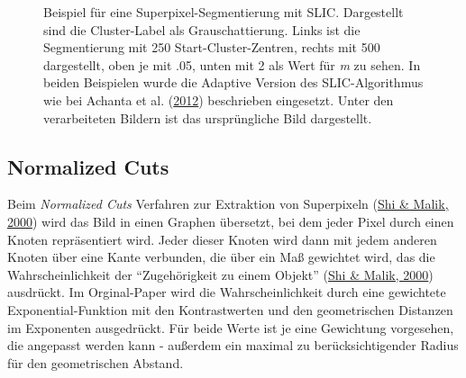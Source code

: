 \documentclass[
  12pt,
  openany]{book}
\begin{document}
\begin{figure}
{}

\caption[Beispiel für eine Superpixel-Segmentierung mit SLIC.]{Beispiel für eine Superpixel-Segmentierung mit SLIC. Dargestellt sind die Cluster-Label als Grauschattierung. Links ist die Segmentierung mit 250 Start-Cluster-Zentren, rechts mit 500 dargestellt, oben je mit .05, unten mit 2 als Wert für \emph{m} zu sehen. In beiden Beispielen wurde die Adaptive Version des SLIC-Algorithmus wie bei Achanta et al. (\protect\hyperlink{ref-achantaSLICSuperpixelsCompared2012}{2012}) beschrieben eingesetzt. Unter den verarbeiteten Bildern ist das ursprüngliche Bild dargestellt.}\label{fig:slicExample}
\end{figure}

\hypertarget{normalized-cuts}{%
\subsection{Normalized Cuts}\label{normalized-cuts}}

Beim \emph{Normalized Cuts} Verfahren zur Extraktion von Superpixeln (\protect\hyperlink{ref-shiNormalizedCutsImage2000}{Shi \& Malik, 2000}) wird das Bild in einen Graphen übersetzt, bei dem jeder Pixel durch einen Knoten repräsentiert wird. Jeder dieser Knoten wird dann mit jedem anderen Knoten über eine Kante verbunden, die über ein Maß gewichtet wird, das die Wahrscheinlichkeit der ``Zugehörigkeit zu einem Objekt'' (\protect\hyperlink{ref-shiNormalizedCutsImage2000}{Shi \& Malik, 2000}) ausdrückt.
Im Orginal-Paper wird die Wahrscheinlichkeit durch eine gewichtete Exponential-Funktion mit den Kontrastwerten und den geometrischen Distanzen im Exponenten ausgedrückt. Für beide Werte ist je eine Gewichtung vorgesehen, die angepasst werden kann - außerdem ein maximal zu berücksichtigender Radius für den geometrischen Abstand.
\end{document}
